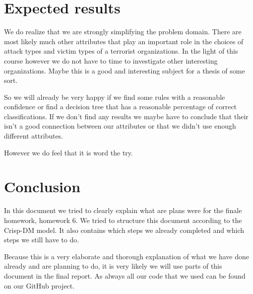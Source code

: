 \documentclass[a4]{article}
\begin{document}
\section{Expected results}
\label{sec:results}
We do realize that we are strongly simplifying the problem domain. There are most likely much other attributes that play an important role in the choices of attack types and victim types of a terrorist organizations. In the light of this course however we do not have to time to investigate other interesting organizations. Maybe this is a good and interesting subject for a thesis of some sort.\par
So we will already be very happy if we find some rules with a reasonable confidence or find a decision tree that has a reasonable percentage of correct classifications. If we don't find any results we maybe have to conclude that their isn't a good connection between our attributes or that we didn't use enough different attributes.\par However we do feel that it is word the try.
\section{Conclusion}
\label{sec:conclusion}
In this document we tried to clearly explain what are plans were for the finale homework, homework 6. We tried to structure this document according to the Crisp-DM model. It also contains which steps we already completed and which steps we still have to do.\par
Because this is a very elaborate and thorough explanation of what we have done already and are planning to do, it is very likely we will use parts of this document in the final report. As always all our code that we used can be found on our GitHub project\cite{githubproject}.
\printbibliography
\end{document}
